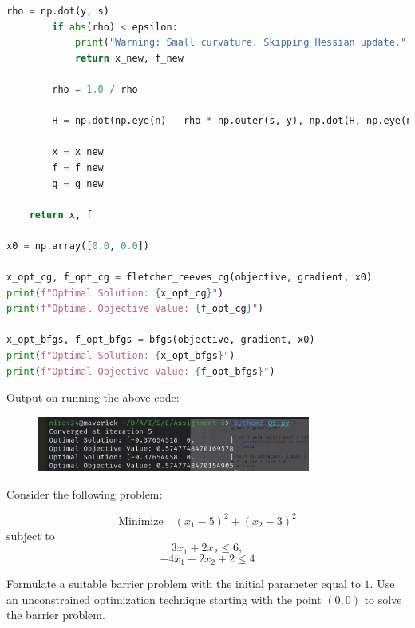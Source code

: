 \documentclass{article}
\begin{document}
\begin{lstlisting}[language=Python]
        rho = np.dot(y, s)
        if abs(rho) < epsilon:
            print("Warning: Small curvature. Skipping Hessian update.")
            return x_new, f_new

        rho = 1.0 / rho 

        H = np.dot(np.eye(n) - rho * np.outer(s, y), np.dot(H, np.eye(n) - rho * np.outer(y, s))) + rho * np.outer(s, s)
        
        x = x_new
        f = f_new
        g = g_new
    
    return x, f  

x0 = np.array([0.0, 0.0])

x_opt_cg, f_opt_cg = fletcher_reeves_cg(objective, gradient, x0)
print(f"Optimal Solution: {x_opt_cg}")
print(f"Optimal Objective Value: {f_opt_cg}")

x_opt_bfgs, f_opt_bfgs = bfgs(objective, gradient, x0)
print(f"Optimal Solution: {x_opt_bfgs}")
print(f"Optimal Objective Value: {f_opt_bfgs}")
\end{lstlisting}

Output on running the above code:

\begin{figure}[H]
    \centering
    \includegraphics[width=0.8\textwidth]{Images/Q5.png}
\end{figure}

\clearpage

\begin{question*}[6]
    Consider the following problem:

    \[
    \text{Minimize} \quad (x_1 - 5)^2 + (x_2 - 3)^2
    \]
    subject to 
    \[
    3x_1 + 2x_2 \leq 6,
    \]
    \[
    -4x_1 + 2x_2 + 2 \leq 4
    \]

    Formulate a suitable barrier problem with the initial parameter equal to $1$. Use an unconstrained optimization technique starting with the point \( (0, 0) \) to solve the barrier problem.
\end{question*}
\end{document}
